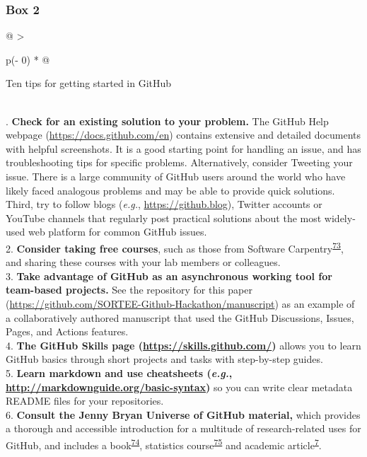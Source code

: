 \hypertarget{tips}{%
\subsubsection{Box 2}\label{tips}}

\begin{tablenos:no-prefix-table-caption}

\begin{longtable}[]{@{}
  >{\raggedright\arraybackslash}p{(\columnwidth - 0\tabcolsep) * }@{}}
\toprule
\begin{minipage}[b]{\linewidth}\raggedright
Ten tips for getting started in GitHub
\end{minipage} \\
\midrule
{}. \textbf{Check for an existing solution to your problem.} The GitHub Help webpage (\url{https://docs.github.com/en}) contains extensive and detailed documents with helpful screenshots. It is a good starting point for handling an issue, and has troubleshooting tips for specific problems. Alternatively, consider Tweeting your issue. There is a large community of GitHub users around the world who have likely faced analogous problems and may be able to provide quick solutions. Third, try to follow blogs (\emph{e.g.}, \url{https://github.blog}), Twitter accounts or YouTube channels that regularly post practical solutions about the most widely-used web platform for common GitHub issues. \\
2. \textbf{Consider taking free courses}, such as those from Software Carpentry\textsuperscript{\protect\hyperlink{ref-pjy75gHr}{73}}, and sharing these courses with your lab members or colleagues. \\
3. \textbf{Take advantage of GitHub as an asynchronous working tool for team-based projects.} See the repository for this paper (\url{https://github.com/SORTEE-Github-Hackathon/manuscript}) as an example of a collaboratively authored manuscript that used the GitHub Discussions, Issues, Pages, and Actions features. \\
4. \textbf{The GitHub Skills page (\url{https://skills.github.com/})} allows you to learn GitHub basics through short projects and tasks with step-by-step guides. \\
5. \textbf{Learn markdown and use cheatsheets (\emph{e.g.}, \url{http://markdownguide.org/basic-syntax})} so you can write clear metadata README files for your repositories. \\
6. \textbf{Consult the Jenny Bryan Universe of GitHub material,} which provides a thorough and accessible introduction for a multitude of research-related uses for GitHub, and includes a book\textsuperscript{\protect\hyperlink{ref-ZvrOcg9w}{74}}, statistics course\textsuperscript{\protect\hyperlink{ref-6CMMeSeD}{75}} and academic article\textsuperscript{\protect\hyperlink{ref-RVetqmsg}{7}}. \\

\end{longtable}
\end{tablenos:no-prefix-table-caption}
